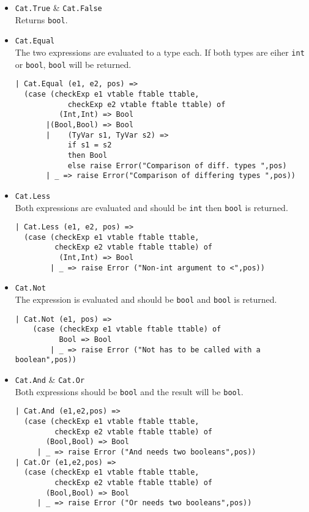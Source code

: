 \documentclass{article}
\begin{document}
\begin{itemize}
	\item {\tt Cat.True} \& {\tt Cat.False} \\
	Returns {\tt bool}.
	\item {\tt Cat.Equal} \\
	The two expressions are evaluated to a type each. If both types are eiher {\tt int} or {\tt bool}, {\tt bool} will be returned.
	\begin{lstlisting}
| Cat.Equal (e1, e2, pos) =>
  (case (checkExp e1 vtable ftable ttable,
            checkExp e2 vtable ftable ttable) of
          (Int,Int) => Bool
       |(Bool,Bool) => Bool
       |	(TyVar s1, TyVar s2) => 
		    if s1 = s2 
		    then Bool 
		    else raise Error("Comparison of diff. types ",pos)
       | _ => raise Error("Comparison of differing types ",pos))
	\end{lstlisting}
	\item {\tt Cat.Less} \\
	Both expressions are evaluated and should be {\tt int} then {\tt bool} is returned.
	\begin{lstlisting}
| Cat.Less (e1, e2, pos) =>
  (case (checkExp e1 vtable ftable ttable,
         checkExp e2 vtable ftable ttable) of
          (Int,Int) => Bool
        | _ => raise Error ("Non-int argument to <",pos))
	\end{lstlisting}
	\item {\tt Cat.Not} \\
	The expression is evaluated and should be {\tt bool} and {\tt bool} is returned.
	\begin{lstlisting}
| Cat.Not (e1, pos) =>
    (case (checkExp e1 vtable ftable ttable) of
	      Bool => Bool
        | _ => raise Error ("Not has to be called with a boolean",pos))
	\end{lstlisting}
	\item {\tt Cat.And} \& {\tt Cat.Or} \\
	Both expressions should be {\tt bool} and the result will be {\tt bool}.
	\begin{lstlisting}
| Cat.And (e1,e2,pos) =>
  (case (checkExp e1 vtable ftable ttable,
         checkExp e2 vtable ftable ttable) of
       (Bool,Bool) => Bool
     | _ => raise Error ("And needs two booleans",pos))
| Cat.Or (e1,e2,pos) =>
  (case (checkExp e1 vtable ftable ttable,
         checkExp e2 vtable ftable ttable) of
       (Bool,Bool) => Bool
     | _ => raise Error ("Or needs two booleans",pos))
	\end{lstlisting}

\end{itemize}
\end{document}
